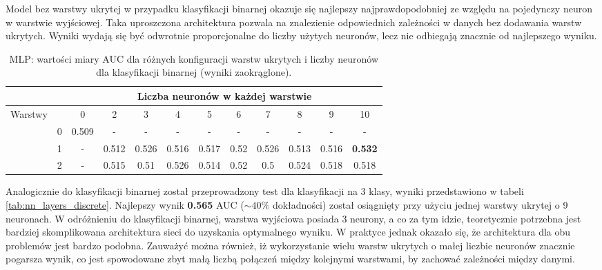 \documentclass[a4paper, twoside, 11pt, openright]{article}
\begin{document}
Model bez warstwy ukrytej w przypadku klasyfikacji binarnej okazuje się najlepszy najprawdopodobniej ze względu na pojedynczy neuron w warstwie wyjściowej. Taka uproszczona architektura pozwala na znalezienie odpowiednich zależności w danych bez dodawania warstw ukrytych. Wyniki wydają się być odwrotnie proporcjonalne do liczby użytych neuronów, lecz nie odbiegają znacznie od najlepszego wyniku.

\begin{table}[H]
    \centering
    \begin{tabular}{|c|c|c|c|c|c|c|c|c|c|c|c|}
        \hline
         & &  \multicolumn{10}{c|}{Liczba neuronów w każdej warstwie}  \\ \hline
        \multirow{4}{*}{Warstwy} & & 0 & 2 & 3 & 4 & 5 & 6 & 7 & 8 & 9 & 10  \\ \cline{2 - 12}
			& 0 & 0.509 & - & - & - & - & - & - & - & - & - \\ \cline{2 - 12} 
			& 1 & - &  0.512 &  0.526 &  0.516 &  0.517 &  0.52 &  0.526 &  0.513 &  0.516  & \textbf{0.532} \\ \cline{2 - 12} 
			& 2 & - & 0.515 &    0.51 &   0.526 &   0.514 &    0.52 &     0.5 &   0.524 &   0.518 & 0.518 \\ \cline{2 - 12} \hline

    \end{tabular}
    \caption{MLP: wartości miary AUC dla różnych konfiguracji warstw ukrytych i liczby neuronów dla klasyfikacji binarnej (wyniki zaokrąglone).}
    \label{tab:nn_layers_binary}
\end{table}

Analogicznie do klasyfikacji binarnej został przeprowadzony test dla klasyfikacji na 3 klasy, wyniki przedstawiono w tabeli \ref{tab:nn_layers_discrete}. Najlepszy wynik \textbf{0.565} AUC ($\sim 40\%$ dokładności) został osiągnięty przy użyciu jednej warstwy ukrytej o 9 neuronach. W odróżnieniu do klasyfikacji binarnej, warstwa wyjściowa posiada 3 neurony, a co za tym idzie, teoretycznie potrzebna jest bardziej skomplikowana architektura sieci do uzyskania optymalnego wyniku. W praktyce jednak okazało się, że architektura dla obu problemów jest bardzo podobna. Zauważyć można również, iż wykorzystanie wielu warstw ukrytych o małej liczbie neuronów znacznie pogarsza wynik, co jest spowodowane zbyt małą liczbą połączeń między kolejnymi warstwami, by zachować zależności między danymi.
\end{document}
